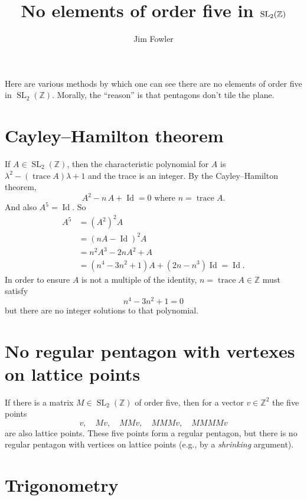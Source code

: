 \documentclass{article}
\title{No elements of order five in $\SL_2(\Z)$}
\author{Jim Fowler}
\DeclareMathOperator{\SL}{SL}
\DeclareMathOperator{\trace}{trace}
\DeclareMathOperator{\Id}{Id}
\newcommand{\Z}{\mathbb{Z}}
\begin{document}
\maketitle

Here are various methods by which one can see there are no elements of
order five in $\SL_2(\Z)$.  Morally, the ``reason'' is that pentagons
don't tile the plane.

\section*{Cayley--Hamilton theorem}

If $A \in \SL_2(\Z)$, then the characteristic polynomial for $A$ is
$\lambda^2 - (\trace A)\lambda + 1$ and the trace is an integer.  By
the Cayley--Hamilton theorem,
\[
A^2 - n\, A + \Id = 0 \mbox{ where $n = \trace A$.}
\]
And also $A^5 = \Id$.  So
\begin{align*}
A^5 &= (A^2)^2 A \\
&= \left(n A - \Id\right)^2 A \\
&= n^2 A^3 - 2 n A^2 + A \\
&= (n^4 - 3 n^2 + 1)A + (2n - n^3) \Id = \Id.
\end{align*}
In order to ensure $A$ is not a multiple of the identity, $n = \trace
A \in \Z$ must satisfy
\[
n^4 - 3 n^2 + 1 = 0
\]
but there are no integer solutions to that polynomial.

\section*{No regular pentagon with vertexes on lattice points}

If there is a matrix $M \in \SL_2(\Z)$ of order five, then for a vector $v \in \Z^2$ the five points
\[
v,\hspace{1em}
Mv,\hspace{1em}
MMv,\hspace{1em}
MMMv,\hspace{1em}
MMMMv
\]
are also lattice points.  These five points form a regular pentagon,
but there is no regular pentagon with vertices on lattice points
(e.g., by a \textit{shrinking} argument).

\section*{Trigonometry}
\end{document}
